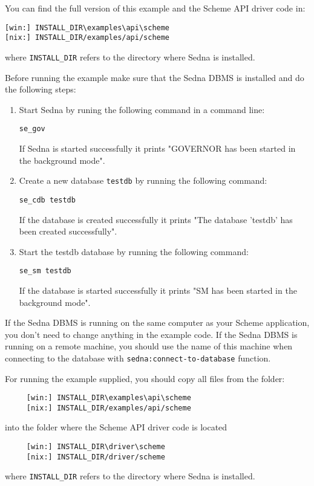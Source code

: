 \documentclass[a4paper,12pt]{article}
\begin{document}
You can find the full version of this example and the Scheme API driver code in:
\begin{verbatim}
[win:] INSTALL_DIR\examples\api\scheme
[nix:] INSTALL_DIR/examples/api/scheme
\end{verbatim}
where \verb!INSTALL_DIR! refers to the directory where Sedna is installed.

Before running the example make sure that the Sedna DBMS is installed and do the
following steps:

\begin{enumerate}
\item Start Sedna by runing the following command in a command line:
\begin{verbatim}
se_gov
\end{verbatim}
If Sedna is started successfully it prints "GOVERNOR has been started in the
background mode".
\item Create a new database \verb!testdb! by running the following command:
\begin{verbatim}
se_cdb testdb
\end{verbatim}
If the database is created successfully it prints "The database 'testdb' has
been created successfully".
\item Start the testdb database by running the following command:
\begin{verbatim}
se_sm testdb
\end{verbatim}
If the database is started successfully it prints "SM has been started in the
background mode".
\end{enumerate}

If the Sedna DBMS is running on the same computer as your Scheme application,
you don't need to change anything in the example code. If the Sedna DBMS is
running on a remote machine, you should use the name of this machine when
connecting to the database with \texttt{sedna:connect-to-database} function.

For running the example supplied, you should copy all files from the folder:
\begin{verbatim}
     [win:] INSTALL_DIR\examples\api\scheme
     [nix:] INSTALL_DIR/examples/api/scheme
\end{verbatim}
into the folder where the Scheme API driver code is located
\begin{verbatim}
     [win:] INSTALL_DIR\driver\scheme
     [nix:] INSTALL_DIR/driver/scheme
\end{verbatim}
where \verb!INSTALL_DIR! refers to the directory where Sedna is installed.
\end{document}
